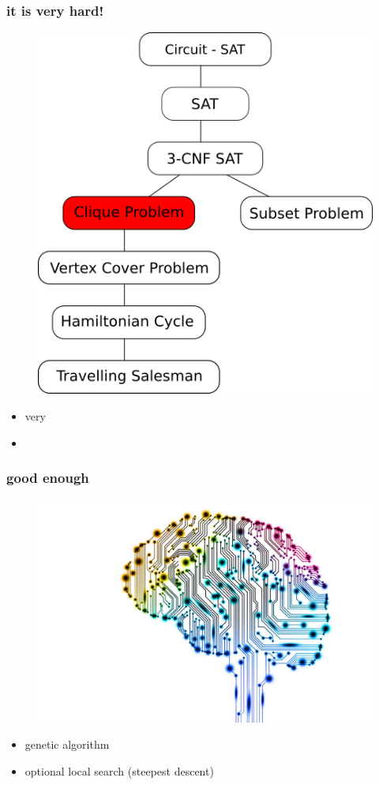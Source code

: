 \documentclass{beamer}
\begin{document}
\begin{frame}
	\frametitle{it is very hard!}

	\begin{figure}
	\centering
	\includegraphics[scale=0.3]{figs/Relative_NPC_chart}
	\end{figure}
	\begin{itemize}
		\item very
		\item 
	\end{itemize}
	
\end{frame}


\begin{frame}
	\frametitle{good enough}
		\begin{figure}
	\includegraphics[scale=0.1]{figs/ai}
	\end{figure}
	\begin{itemize}
		\item genetic algorithm
		\item optional local search (steepest descent)
	\end{itemize}
	
\end{frame}
\end{document}
